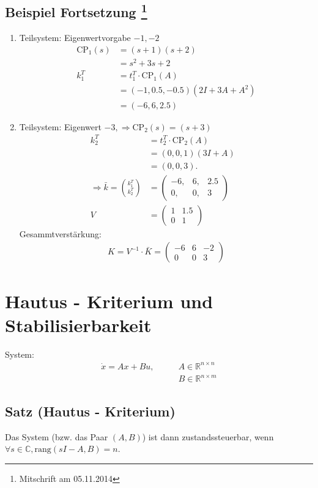 \documentclass[ngerman]{tudscrreprt}
\begin{document}
\subsection*{Beispiel Fortsetzung \footnote{Mitschrift am 05.11.2014}}
\begin{enumerate}
\item Teilsystem: Eigenwertvorgabe $-1, -2$ 
\begin{align*}
\text{CP}_1(s) &= (s+1)(s+2)\\ 
&= s^2 + 3s + 2\\ 
k_1^T &= t_1^T \cdot \text{CP}_1(A)\\ 
&=(-1, 0.5, -0.5)(2I + 3A + A^2)\\ 
&=(-6, 6, 2.5)
\end{align*}
\item Teilsystem: Eigenwert $-3, \Rightarrow \text{CP}_2(s) = (s + 3)$
\begin{align*}
k_2^T &= t_2^T\cdot \text{CP}_2(A)\\ 
&= ( 0, 0, 1)(3I + A)\\ 
&= (0, 0, 3).\\ 
\Rightarrow \bar k = \binom{k_1^T}{k_2^T} &= \begin{pmatrix} -6, &6, & 2.5\\ 0, & 0,& 3 \end{pmatrix}\\ 
V&= \begin{pmatrix} 1 & 1.5\\ 0 & 1 \end{pmatrix}&
\end{align*}
Gesammtverstärkung: \begin{align*}
K = V^{-1}\cdot \bar K = \begin{pmatrix} -6 & 6 & -2\\ 0 & 0 & 3\end{pmatrix}
\end{align*}
\end{enumerate}
\section{Hautus - Kriterium und Stabilisierbarkeit}
System: \begin{align*} 
\dot x = A x + B u, \qquad &A\in \mathbb{R}^{n\times n}\\ &B \in \mathbb{R}^{n\times m}
\end{align*}
\subsection*{Satz (Hautus - Kriterium)} Das System (bzw. das Paar $(A,B)$) ist dann zustandssteuerbar, wenn $\forall s \in \mathbb{C} ,\text{rang} (sI - A, B) = n.$\\ 
\end{document}
